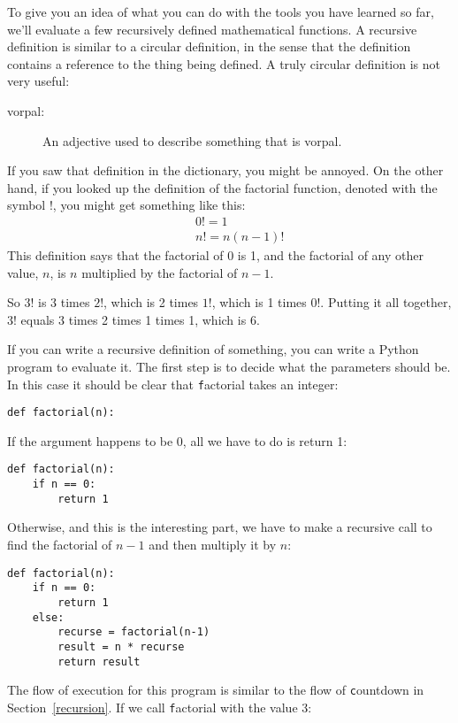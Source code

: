 \documentclass[
DIV=11,
fontsize=12,
twoside,
headinclude=false,
titlepage=firstiscover,
abstract=true,
headsepline=true,
footsepline=true,
chapterprefix=true, %
headings=big,
bibliography=totoc,%
captions=tableheading
]{scrbook}
\theoremstyle{definition}
\begin{document}
To give you an idea of what you can do with the tools you have learned
so far, we'll evaluate a few recursively defined mathematical
functions.  A recursive definition is similar to a circular
definition, in the sense that the definition contains a reference to
the thing being defined.  A truly circular definition is not very
useful:

\begin{description}

\item[vorpal:] An adjective used to describe something that is vorpal.

\end{description}

If you saw that definition in the dictionary, you might be annoyed. On
the other hand, if you looked up the definition of the factorial
function, denoted with the symbol $!$, you might get something like
this:
%
\begin{eqnarray*}
&&  0! = 1 \\
&&  n! = n (n-1)!
\end{eqnarray*}
%
This definition says that the factorial of 0 is 1, and the factorial
of any other value, $n$, is $n$ multiplied by the factorial of $n-1$.

So $3!$ is 3 times $2!$, which is 2 times $1!$, which is 1 times
$0!$. Putting it all together, $3!$ equals 3 times 2 times 1 times 1,
which is 6.

If you can write a recursive definition of something, you can
write a Python program to evaluate it. The first step is to decide
what the parameters should be.  In this case it should be clear
that {\texttt factorial} takes an integer:

\begin{lstlisting}
def factorial(n):
\end{lstlisting}
%
If the argument happens to be 0, all we have to do is return 1:

\begin{lstlisting}
def factorial(n):
    if n == 0:
        return 1
\end{lstlisting}
%
Otherwise, and this is the interesting part, we have to make a
recursive call to find the factorial of $n-1$ and then multiply it by
$n$:

\begin{lstlisting}
def factorial(n):
    if n == 0:
        return 1
    else:
        recurse = factorial(n-1)
        result = n * recurse
        return result
\end{lstlisting}
%
The flow of execution for this program is similar to the flow of {\texttt
countdown} in Section~\ref{recursion}.  If we call {\texttt factorial}
with the value 3:
\end{document}
